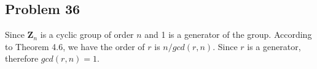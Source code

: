 \subsection*{Problem 36}
\noindent Since $\mathbf{Z}_n$ is a cyclic group of order $n$ and 1 is a generator of the group. According to Theorem 4.6, we have the order of $r$ is $n / gcd(r, n)$. Since $r$ is a generator, therefore $gcd(r, n) = 1$. 

